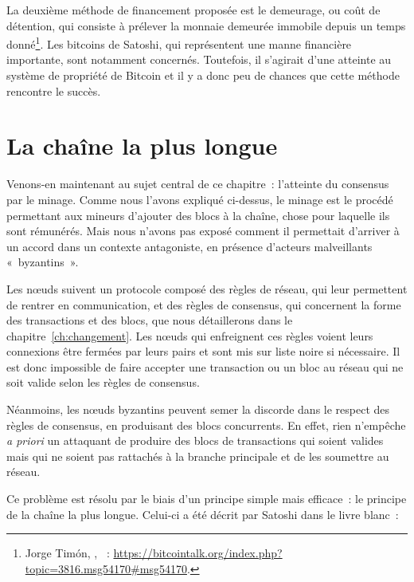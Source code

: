La deuxième méthode de financement proposée est le demeurage, ou coût de détention, qui consiste à prélever la monnaie demeurée immobile depuis un temps donné\footnote{Jorge Timón, , ~: \url{https://bitcointalk.org/index.php?topic=3816.msg54170\#msg54170}.}. Les bitcoins de Satoshi, qui représentent une manne financière importante, sont notamment concernés. Toutefois, il s'agirait d'une atteinte au système de propriété de Bitcoin et il y a donc peu de chances que cette méthode rencontre le succès.

\section*{La chaîne la plus longue}

Venons-en maintenant au sujet central de ce chapitre~: l'atteinte du consensus par le minage. Comme nous l'avons expliqué ci-dessus, le minage est le procédé permettant aux mineurs d'ajouter des blocs à la chaîne, chose pour laquelle ils sont rémunérés. Mais nous n'avons pas exposé comment il permettait d'arriver à un accord dans un contexte antagoniste, en présence d'acteurs malveillants «~byzantins~».

Les nœuds suivent un protocole composé des règles de réseau, qui leur permettent de rentrer en communication, et des règles de consensus, qui concernent la forme des transactions et des blocs, que nous détaillerons dans le chapitre~\ref{ch:changement}. Les nœuds qui enfreignent ces règles voient leurs connexions être fermées par leurs pairs et sont mis sur liste noire si nécessaire. Il est donc impossible de faire accepter une transaction ou un bloc au réseau qui ne soit valide selon les règles de consensus.

Néanmoins, les nœuds byzantins peuvent semer la discorde dans le respect des règles de consensus, en produisant des blocs concurrents. En effet, rien n'empêche \emph{a priori} un attaquant de produire des blocs de transactions qui soient valides mais qui ne soient pas rattachés à la branche principale et de les soumettre au réseau.


Ce problème est résolu par le biais d'un principe simple mais efficace~: le principe de la chaîne la plus longue. Celui-ci a été décrit par Satoshi dans le livre blanc~: 

